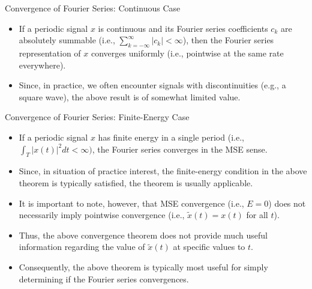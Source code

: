 
\begin{frame}{Convergence of Fourier Series: Continuous Case}
\begin{itemize}
\item If a periodic signal $x$ is {\color{red}continuous} and its Fourier series coefficients $c_k$ are {\color{red}absolutely summable} (i.e., $\sum_{k=-\infty}^{\infty}|c_{k}|<\infty$), then the Fourier series representation of $x$ converges {\color{red}uniformly} (i.e., {\color{blue}pointwise at the same rate everywhere}).
\item Since, in practice, we often encounter signals with discontinuities (e.g., a square wave), the above result is of somewhat limited value.
\end{itemize}
\end{frame}


\begin{frame}{Convergence of Fourier Series: Finite-Energy Case}
\begin{itemize}
\item If a periodic signal $x$ has finite energy in a single period (i.e., $\int_{T} \left|x(t)\right|^2dt<\infty)$, the Fourier series converges in the MSE sense.
\item Since, in situation of practice interest, the finite-energy condition in the above theorem is typically satisfied, the theorem is usually applicable.
\item It is important to note, however, that MSE convergence (i.e., $E=0$) does not necessarily imply pointwise convergence (i.e., $\tilde{x}(t)=x(t)$ for all $t$).
\item Thus, the above convergence theorem does not provide much useful information regarding the value of $\tilde{x}(t)$ at specific values to  $t$.
\item Consequently, the above theorem is typically most useful for simply determining if the Fourier series convergences.
\end{itemize}
\end{frame}

